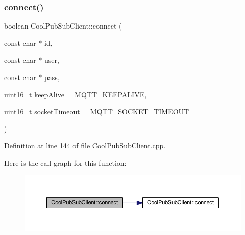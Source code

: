 \subsubsection{\texorpdfstring{connect()}{connect()}\hspace{0.1cm}{\footnotesize\ttfamily [2/4]}}
{\footnotesize\ttfamily boolean Cool\+Pub\+Sub\+Client\+::connect (\begin{DoxyParamCaption}\item[{const char $\ast$}]{id,  }\item[{const char $\ast$}]{user,  }\item[{const char $\ast$}]{pass,  }\item[{uint16\+\_\+t}]{keep\+Alive = {\ttfamily \hyperlink{_cool_pub_sub_client_8h_afb4dd8c75385ab30e659314df7c2c335}{M\+Q\+T\+T\+\_\+\+K\+E\+E\+P\+A\+L\+I\+VE}},  }\item[{uint16\+\_\+t}]{socket\+Timeout = {\ttfamily \hyperlink{_cool_pub_sub_client_8h_a092cc564e4d7f03fdab6137e30a7f05b}{M\+Q\+T\+T\+\_\+\+S\+O\+C\+K\+E\+T\+\_\+\+T\+I\+M\+E\+O\+UT}} }\end{DoxyParamCaption})}



Definition at line 144 of file Cool\+Pub\+Sub\+Client.\+cpp.

Here is the call graph for this function\+:\nopagebreak
\begin{figure}[H]
\begin{center}
\leavevmode
\includegraphics[width=350pt]{class_cool_pub_sub_client_a7f30e39bf4ca5ea5fb9747c403639a03_cgraph}
\end{center}
\end{figure}
\mbox{\label{class_cool_pub_sub_client_af461a5a08fda1c3237e706965704ddb6}} 
